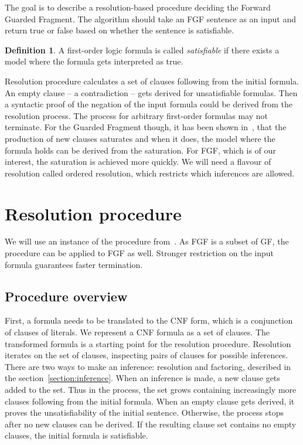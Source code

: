 \documentclass[english, shortabstract]{iithesis}
\theoremstyle{definition} \newtheorem{definition}{Definition}[chapter]
\theoremstyle{remark} \newtheorem{remark}[definition]{Observation}
\theoremstyle{plain} \newtheorem{theorem}[definition]{Theorem}
\theoremstyle{plain} \newtheorem{lemma}[definition]{Lemma}
\begin{document}
The goal is to describe a resolution-based procedure deciding the Forward Guarded Fragment.
The algorithm should take an FGF sentence as an input and return true or false based on whether the sentence is satisfiable.

\begin{definition}
A first-order logic formula is called \emph{satisfiable} if there exists a model where the formula gets interpreted as true.
\end{definition}

Resolution procedure calculates a set of clauses following from the initial formula.
An empty clause -- a contradiction -- gets derived for unsatisfiable formulas. 
Then a syntactic proof of the negation of the input formula could be derived from the resolution process.
The process for arbitrary first-order formulas may not terminate.
For the Guarded Fragment though, it has been shown in~\cite{nivelle}, that the production of new clauses saturates
and when it does, the model where the formula holds can be derived from the saturation.
For FGF, which is of our interest, the saturation is achieved more quickly.
We will need a flavour of resolution called ordered resolution, which restricts which inferences are allowed.

\chapter{Resolution procedure}

We will use an instance of the procedure from~\cite{nivelle}. 
As FGF is a subset of GF, the procedure can be applied to FGF as well.
Stronger restriction on the input formula guarantees faster termination.

\section{Procedure overview}

First, a formula needs to be translated to the CNF form, which is a conjunction of clauses of literals. 
We represent a CNF formula as a set of clauses. The transformed formula is a starting point for the resolution procedure.
Resolution iterates on the set of clauses, inspecting pairs of clauses for possible inferences.
There are two ways to make an inference: resolution and factoring, described in the section~\ref{section:inference}.
When an inference is made, a new clause gets added to the set.
Thus in the process, the set grows containing increasingly more clauses following from the initial formula.
When an empty clause gets derived, it proves the unsatisfiability of the initial sentence.
Otherwise, the process stops after no new clauses can be derived. If the resulting 
clause set contains no empty clauses, the initial formula is satisfiable.
\end{document}
